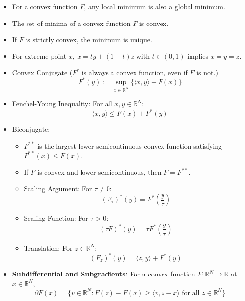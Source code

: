 \documentclass{article}
\begin{document}
\begin{itemize}
 \item For a convex function \( F \), any local minimum is also a global minimum.

  \item The set of minima of a convex function \( F \) is convex.

 \item If \( F \) is strictly convex, the minimum is unique.

 \item For extreme point \( x, \ x = ty + (1-t)z \) with \( t \in (0,1) \) implies \( x = y = z \).


 \item Convex Conjugate (\( F^* \) is always a convex function, even if \( F \) is not.)
  \[
    F^*(y) := \sup_{x \in \mathbb{R}^N} \{ \langle x, y \rangle - F(x) \}
    \]

\item Fenchel-Young Inequality: For all \( x, y \in \mathbb{R}^N \):
    \[
    \langle x, y \rangle \leq F(x) + F^*(y)
    \]

\item Biconjugate:
\begin{itemize}
        \item \( F^{**} \) is the largest lower semicontinuous convex function satisfying \( F^{**}(x) \leq F(x) \).
        \item If \( F \) is convex and lower semicontinuous, then \( F = F^{**} \).

         \item Scaling Argument:  For \( \tau \neq 0 \):
        \[
        (F_\tau)^*(y) = F^*\left(\frac{y}{\tau}\right)
        \]

        \item Scaling Function: For \( \tau > 0 \):
        \[
        (\tau F)^*(y) = \tau F^*\left(\frac{y}{\tau}\right)
        \]

        \item Translation: For \( z \in \mathbb{R}^N \):
        \[
        (F_z)^*(y) = \langle z, y \rangle + F^*(y)
        \]
    \end{itemize}



 \item \textbf{Subdifferential and Subgradients:} For a convex function \( F : \mathbb{R}^N \to \mathbb{R} \) at \( x \in \mathbb{R}^N \),
    \[
    \partial F(x) = \{ v \in \mathbb{R}^N : F(z) - F(x) \geq \langle v, z - x \rangle \text{ for all } z \in \mathbb{R}^N \}
    \]


\end{itemize}
\end{document}
